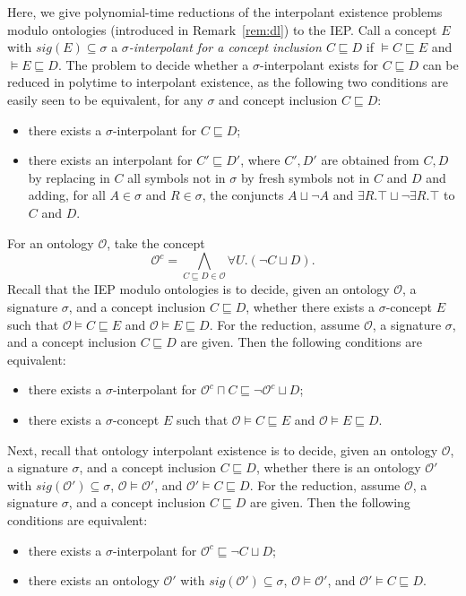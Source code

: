 \documentclass[10pt,a4paper]{amsart}
\theoremstyle{plain}
\theoremstyle{definition}
\newcommand{\sig}{\mathit{sig}}
\begin{document}
\begin{appendix}
Here, we give polynomial-time reductions of the interpolant existence problems modulo ontologies (introduced in Remark~\ref{rem:dl}) to the IEP. Call a concept $E$ with $\sig(E)\subseteq \sigma$ a \emph{$\sigma$-interpolant for a concept inclusion $C \sqsubseteq D$} if $\models C \sqsubseteq E$ and $\models E \sqsubseteq D$. The problem to decide whether a $\sigma$-interpolant exists for $C \sqsubseteq D$ can be reduced in polytime to interpolant existence, as the following two conditions are easily seen to be equivalent, for any $\sigma$ and concept inclusion $C \sqsubseteq D$:
\begin{itemize}
\item[--] there exists a $\sigma$-interpolant for $C \sqsubseteq D$;
\item[--] there exists an interpolant for $C'\sqsubseteq D'$, where $C',D'$ are obtained from $C,D$ by replacing in $C$ all symbols not in $\sigma$ by fresh symbols not in $C$ and $D$ and adding, for all $A\in \sigma$ and $R\in \sigma$, the conjuncts $A \sqcup \neg A$ and $\exists R.\top \sqcup \neg \exists R.\top$ to $C$ and $D$. 
\end{itemize}  
%
For an ontology $\mathcal{O}$, take the concept 
%
$$
\mathcal{O}^{c}=\bigwedge_{C\sqsubseteq D\in \mathcal{O}} \forall U.(\neg C \sqcup D).
$$
%
Recall that the IEP modulo ontologies is to decide, given an ontology $\mathcal{O}$, a signature $\sigma$, and a concept inclusion $C \sqsubseteq D$, whether there exists a $\sigma$-concept $E$ such that $\mathcal{O}\models C \sqsubseteq E$ and $\mathcal{O}\models E \sqsubseteq D$.  
For the reduction, assume $\mathcal{O}$, a signature $\sigma$, and a concept inclusion $C \sqsubseteq D$ are given.
Then the following conditions are equivalent:
%
\begin{itemize}
	\item[--] there exists a $\sigma$-interpolant for $\mathcal{O}^{c} \sqcap C \sqsubseteq \neg \mathcal{O}^{c} \sqcup D$;
	\item[--] there exists a $\sigma$-concept $E$ such that $\mathcal{O}\models C \sqsubseteq E$ and $\mathcal{O}\models E \sqsubseteq D$.
\end{itemize}		
%
Next, recall that ontology interpolant existence is to decide, given an ontology $\mathcal{O}$, a signature $\sigma$, and a concept inclusion $C \sqsubseteq D$, whether there is an ontology $\mathcal{O}'$ with $\sig(\mathcal{O}') \subseteq \sigma$, $\mathcal{O}\models \mathcal{O}'$, and $\mathcal{O}' \models C \sqsubseteq D$.  
For the reduction, assume $\mathcal{O}$, a signature $\sigma$, and a concept inclusion $C \sqsubseteq D$ are given.
Then the following conditions are equivalent:
%
\begin{itemize}
		\item[--] there exists a $\sigma$-interpolant for $\mathcal{O}^{c} \sqsubseteq \neg C \sqcup D$;
		\item[--] there exists an ontology $\mathcal{O}'$ with $\sig(\mathcal{O}') \subseteq \sigma$, $\mathcal{O}\models \mathcal{O}'$, and $\mathcal{O}' \models C \sqsubseteq D$.
\end{itemize}


\end{appendix}
\end{document}
